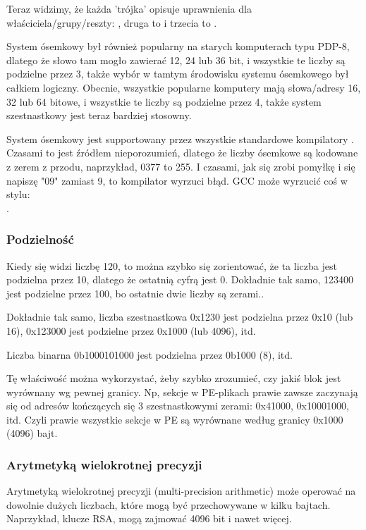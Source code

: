 Teraz widzimy, że każda 'trójka' opisuje uprawnienia dla właściciela/grupy/reszty: , druga to  i trzecia to .

System ósemkowy był również popularny na starych komputerach typu PDP-8, dlatego że słowo tam mogło zawierać 12, 24 lub
36 bit, i wszystkie te liczby są podzielne przez 3, także wybór w tamtym środowisku systemu ósemkowego był całkiem logiczny.
Obecnie, wszystkie popularne komputery mają słowa/adresy 16, 32 lub 64 bitowe, i wszystkie te liczby są podzielne przez 4,
także system szestnastkowy jest teraz bardziej stosowny.

System ósemkowy jest supportowany przez wszystkie standardowe kompilatory \CCpp{}.
Czasami to jest źródłem nieporozumień, dlatego że liczby ósemkowe są kodowane z zerem z przodu, naprzykład, 0377 to 255.
I czasami, jak się zrobi pomyłkę i się napiszę "09" zamiast 9, to kompilator wyrzuci błąd.
GCC może wyrzucić coś w stylu:\\
.


\subsubsection{Podzielność}

Kiedy się widzi liczbę 120, to można szybko się zorientować, że ta liczba jest podzielna przez 10, dlatego że ostatnią cyfrą jest 0.
Dokładnie tak samo, 123400 jest podzielne przez 100, bo ostatnie dwie liczby są zerami..

Dokładnie tak samo, liczba szestnastkowa 0x1230 jest podzielna przez 0x10 (lub 16), 0x123000 jest podzielne przez 0x1000 (lub 4096), itd.

Liczba binarna 0b1000101000 jest podzielna przez 0b1000 (8), itd.

Tę właściwość można wykorzystać, żeby szybko zrozumieć,
czy jakiś blok jest wyrównany wg pewnej granicy.
Np, sekcje w \ac{PE}-plikach prawie zawsze zaczynają się od adresów kończących się 3 szestnastkowymi zerami:
0x41000, 0x10001000, itd.
Czyli prawie wszystkie sekcje w \ac{PE} są wyrównane według granicy 0x1000 (4096) bajt.

\subsubsection{Arytmetyką wielokrotnej precyzji}

Arytmetyką wielokrotnej precyzji (multi-precision arithmetic) może operować na dowolnie dużych liczbach,
które mogą być przechowywane w kilku bajtach.
Naprzykład, klucze RSA, mogą zajmować 4096 bit i nawet więcej.

